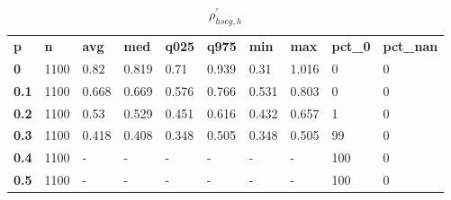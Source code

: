 \begin{table}[h]
 \centering 
\footnotesize
\caption{$\rho_{hscg,h}^\prime $}
\label{tab:alphahscgh}
\begin{tabular}[h]{| l l l l l l l l l l|
    } \hline
\textbf{ p} & \textbf{ n} & \textbf{ avg} & \textbf{ med} & \textbf{ q025} & \textbf{ q975} & \textbf{ min} & \textbf{ max} & \textbf{ pct\_0} & \textbf{ pct\_nan}
           \\
  \textbf{  0} & 1100 &  0.82 & 0.819 &  0.71 & 0.939 &  0.31 & 1.016 &   0 & 0
           \\
  \textbf{0.1} & 1100 & 0.668 & 0.669 & 0.576 & 0.766 & 0.531 & 0.803 &   0 & 0
           \\
  \textbf{0.2} & 1100 &  0.53 & 0.529 & 0.451 & 0.616 & 0.432 & 0.657 &   1 & 0
           \\
  \textbf{0.3} & 1100 & 0.418 & 0.408 & 0.348 & 0.505 & 0.348 & 0.505 &  99 & 0
           \\
  \textbf{0.4} & 1100 & - & - & - & - & - & - & 100 & 0
           \\
  \textbf{0.5} & 1100 & - & - & - & - & - & - & 100 & 0
           \\
 \hline \end{tabular}
 \end{table}
